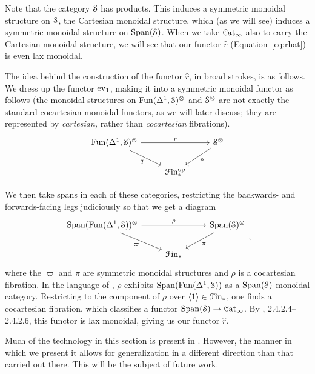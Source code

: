 \documentclass[main.tex]{subfiles}
\begin{document}
Note that the category $\S$ has products. This induces a symmetric monoidal structure on $\S$, the Cartesian monoidal structure, which (as we will see) induces a symmetric monoidal structure on $\Span(\S)$. When we take $\Cat_{\infty}$ also to carry the Cartesian monoidal structure, we will see that our functor $\hat{r}$ (\hyperref[eq:rhat]{Equation~\ref*{eq:rhat}}) is even lax monoidal.

The idea behind the construction of the functor $\hat{r}$, in broad strokes, is as follows. We dress up the functor $\ev_{1}$, making it into a symmetric monoidal functor as follows (the monoidal structures on $\Fun(\Delta^{1}, \S)^{\otimes}$ and $\S^{\otimes}$ are not exactly the standard cocartesian monoidal functors, as we will later discuss; they are represented by \emph{cartesian,} rather than \emph{cocartesian} fibrations).
\begin{equation*}
  \begin{tikzcd}
    \Fun(\Delta^{1}, \S)^{\otimes}
    \arrow[rr, "r"]
    \arrow[dr, swap, "q"]
    && \S^{\otimes}
    \arrow[dl, "p"]
    \\
    & \Finp\op
  \end{tikzcd}
\end{equation*}

We then take spans in each of these categories, restricting the backwards- and forwards-facing legs judiciously so that we get a diagram
\begin{equation*}
  \begin{tikzcd}
    \Span(\Fun(\Delta^{1}, \S))^{\otimes}
    \arrow[rr, "\rho"]
    \arrow[dr, swap, "\varpi"]
    && \Span(\S)^{\otimes}
    \arrow[dl, "\pi"]
    \\
    & \Finp
  \end{tikzcd},
\end{equation*}
where the $\varpi$ and $\pi$ are symmetric monoidal structures and $\rho$ is a cocartesian fibration. In the language of \cite{luriehigheralgebra}, $\rho$ exhibits $\Span(\Fun(\Delta^{1}, \S))$ as a $\Span(\S)$-monoidal category. Restricting to the component of $\rho$ over $\langle 1 \rangle \in \Finp$, one finds a cocartesian fibration, which classifies a functor $\Span(\S) \to \ICat$. By \cite{luriehigheralgebra}, 2.4.2.4--2.4.2.6, this functor is lax monoidal, giving us our functor $\hat{r}$.

Much of the technology in this section is present in \cite{spectralmackeyfunctors2}. However, the manner in which we present it allows for generalization in a different direction than that carried out there. This will be the subject of future work.
\end{document}
